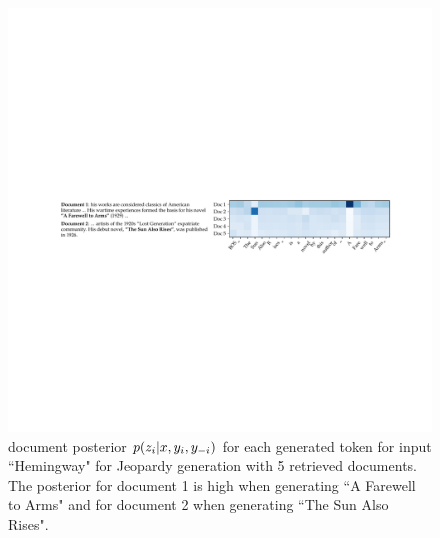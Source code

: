 \begin{figure}
\centering

  \includegraphics[width=\textwidth]{images/posterior_plot}
  \vspace{-15pt}
\caption{\ragtoken{} document posterior $p(z_i|x, y_i, y_{-i})$ for each generated token for input ``Hemingway" for Jeopardy generation with 5 retrieved documents. The posterior for document 1 is high when generating ``A Farewell to Arms" and for document 2 when generating ``The Sun Also Rises". }
  \label{fig:posterior_plot}
\end{figure}

